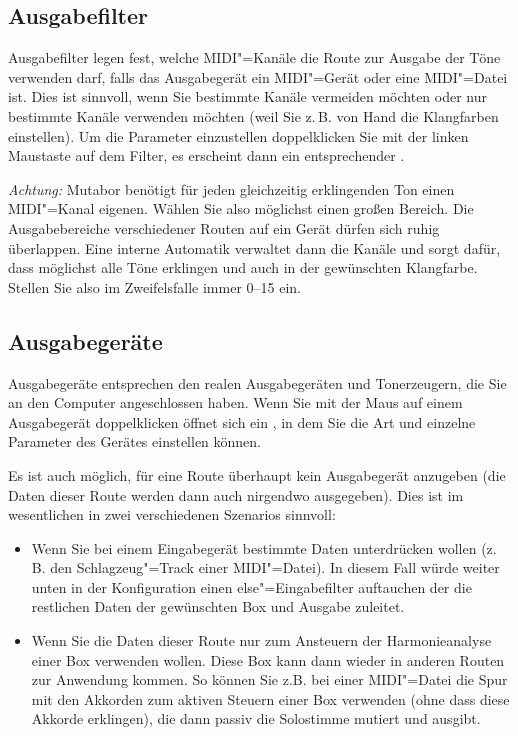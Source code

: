{
\subsection{Ausgabefilter}\label{sec:ausgabefilter}

Ausgabefilter legen fest, welche MIDI"=Kanäle die Route zur Ausgabe der 
Töne verwenden darf, falls das Ausgabegerät ein MIDI"=Gerät 
oder eine MIDI"=Datei ist. Dies ist sinnvoll, wenn Sie bestimmte 
Kanäle vermeiden möchten oder nur bestimmte Kanäle verwenden 
möchten (weil Sie z.\,B. von Hand die Klangfarben einstellen). 
Um die Parameter einzustellen doppelklicken Sie mit der linken 
Maustaste auf dem Filter, es erscheint dann ein entsprechender 
.


\emph{Achtung:} Mutabor benötigt für jeden gleichzeitig erklingenden
Ton einen MIDI"=Kanal eigenen. Wählen Sie also möglichst einen großen
Bereich. Die Ausgabebereiche verschiedener Routen auf ein Gerät dürfen
sich ruhig überlappen. Eine interne Automatik verwaltet dann die
Kanäle und sorgt dafür, dass möglichst alle Töne erklingen und auch in
der gewünschten Klangfarbe. Stellen Sie also im Zweifelsfalle immer
0--15 ein.

\subsection{Ausgabegeräte}\label{sec:ausgabegerate}

Ausgabegeräte entsprechen den realen Ausgabegeräten und Tonerzeugern, die Sie
an den Computer angeschlossen haben. Wenn Sie mit der Maus auf einem
Ausgabegerät doppelklicken öffnet sich ein
, in dem Sie die Art und einzelne Parameter
des Gerätes einstellen können.


Es ist auch möglich, für eine Route überhaupt kein Ausgabegerät 
anzugeben (die Daten dieser Route werden dann auch nirgendwo ausgegeben). 
Dies ist im wesentlichen in zwei verschiedenen Szenarios sinnvoll:

\begin{itemize}
\item Wenn Sie bei einem Eingabegerät bestimmte Daten unterdrücken
  wollen (z.\,B. den Schlagzeug"=Track einer MIDI"=Datei). In diesem
  Fall würde weiter unten in der Konfiguration einen
  else"=Eingabefilter auftauchen der die restlichen Daten der
  gewünschten Box und Ausgabe zuleitet.
\item Wenn Sie die Daten dieser Route nur zum Ansteuern der
  Harmonieanalyse einer Box verwenden wollen. Diese Box kann dann
  wieder in anderen Routen zur Anwendung kommen. So können Sie z.B.
  bei einer MIDI"=Datei die Spur mit den Akkorden zum aktiven Steuern
  einer Box verwenden (ohne dass diese Akkorde erklingen), die dann
  passiv die Solostimme mutiert und ausgibt.
\end{itemize}


}
